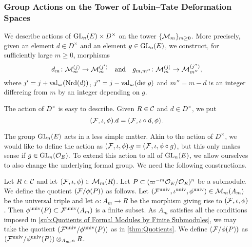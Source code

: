 \documentclass[../main.tex]{subfiles}
\begin{document}

\subsubsection{Group Actions on the Tower of Lubin--Tate Deformation Spaces} %
\label{ssub:Group Actions on the Tower of Lubin--Tate Deformation Spaces}
We describe actions of $\operatorname{GL}_n(E) \times D^\times$ on the tower
$\{\mathcal{M}_m\}_{m \geq 0}$. More precisely, given an element $d \in D^\times$ and an element
$g \in \operatorname{GL}_n(E)$, we construct, for sufficiently large $m\geq 0$, morphisms
\begin{equation*}
  d_m \colon \mathcal{M}_m^{(j)} \to \mathcal{M}_m^{(j')} \quad \text{and} \quad
  g_{m,m''} \colon \mathcal{M}_m^{(j)} \to \mathcal{M}_{m''}^{(j'')},
\end{equation*}
where $j'= j+\mathrm{val}_\varpi(\operatorname{Nrd}(d))$, $j'' = j - \mathrm{val}_\varpi(\det g)$ and $m''
= m-d$ is an integer differeing from $m$ by an integer depending on $g$. 

The action of $D^\times$ is easy to describe. Given $R \in \mathcal{C}$ and 
$d \in D^\times$, we put
\begin{equation*}
  (\mathcal{F}, \iota, \phi).d = (\mathcal{F}, \iota \circ d, \phi).
\end{equation*}

The group $\operatorname{GL}_n(E)$ acts in a less simple matter. Akin to the action of
$D^\times$, we would like to define the action as
$(\mathcal{F}, \iota, \phi).g = (\mathcal{F}, \iota, \phi \circ g)$, but this only makes sense
if $g \in \operatorname{GL}_n(\mathcal{O}_E)$. To extend this action to all of $\operatorname{GL}_n(E)$, we
allow ourselves to also change the underlying formal group.
We need the following constructions.

\begin{defi}\label{def:QuotientModule}
  Let $R \in \mathcal{C}$ and let $(\mathcal{F}, \iota, \phi) \in \mathcal{M}_m(R)$. Let
  $P \subset (\varpi^{-m}\mathcal{O}_E/\mathcal{O}_E)^n$ be a submodule.
  We define the quotient $(\mathcal{F}/\phi(P))$ as follows. Let 
  $(\mathcal{F}^{\mathrm{univ}}, \iota^{\mathrm{univ}}, \phi^{{\mathrm{univ}}}) \in \mathcal{M}_m(A_m)$ be the universal 
  triple and let $\alpha\colon A_m \to R$ be the morphism giving rise to
  $(\mathcal{F}, \iota, \phi)$. Then $\phi^{\mathrm{univ}}(P) \subset \mathcal{F}^{\mathrm{univ}}(A_m)$ is a 
  finite subset. As $A_m$ satisfies all the conditions imposed in
  \cref{sub:Quotients of Formal Modules by Finite Submodules}, we may take the quotient
  $(\mathcal{F}^{\mathrm{univ}}/\phi^{\mathrm{univ}}(P))$ as in \cref{thm:Quotients}. We define
  $(\mathcal{F}/\phi(P))$ as $(\mathcal{F}^{\mathrm{univ}}/\phi^{\mathrm{univ}}(P))\otimes_{A_m,\alpha} R$. 
\end{defi}
\end{document}
